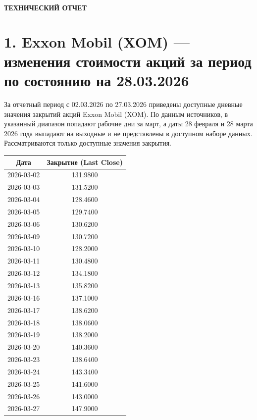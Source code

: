 \documentclass[12pt]{article}
\begin{document}
\begin{center}
\textbf{\LARGE ТЕХНИЧЕСКИЙ ОТЧЕТ}
\end{center}

\vspace{1cm}


\section*{1. Exxon Mobil (XOM) — изменения стоимости акций за период по состоянию на 28.03.2026}
За отчетный период с 02.03.2026 по 27.03.2026 приведены доступные дневные значения закрытий акций Exxon Mobil (XOM). По данным источников, в указанный диапазон попадают рабочие дни за март, а даты 28 февраля и 28 марта 2026 года выпадают на выходные и не представлены в доступном наборе данных. Рассматриваются только доступные значения закрытия.

\begin{center}
\begin{tabular}{|c|c|}
\hline
Дата & Закрытие (Last Close) \\
\hline
2026-03-02 & 131.9800 \\
2026-03-03 & 131.5200 \\
2026-03-04 & 128.4600 \\
2026-03-05 & 129.7400 \\
2026-03-06 & 130.6200 \\
2026-03-09 & 130.7200 \\
2026-03-10 & 128.2000 \\
2026-03-11 & 130.4800 \\
2026-03-12 & 134.1800 \\
2026-03-13 & 135.8200 \\
2026-03-16 & 137.1000 \\
2026-03-17 & 138.6200 \\
2026-03-18 & 138.0600 \\
2026-03-19 & 138.2000 \\
2026-03-20 & 140.3600 \\
2026-03-23 & 138.6400 \\
2026-03-24 & 143.3400 \\
2026-03-25 & 141.6000 \\
2026-03-26 & 143.0000 \\
2026-03-27 & 147.9000 \\
\hline
\end{tabular}
\end{center}
\end{document}
